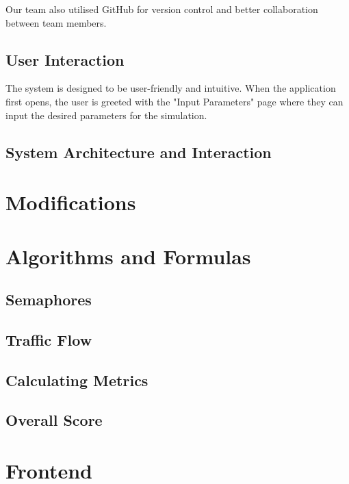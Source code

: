 \documentclass{article}
\begin{document}
        Our team also utilised GitHub for version control and better collaboration between team members.

    \subsection{User Interaction}

        The system is designed to be user-friendly and intuitive. When the application first opens, the user is greeted with the "Input Parameters"
        page where they can input the desired parameters for the simulation.
        
    \subsection{System Architecture and Interaction}

\section{Modifications}

\section{Algorithms and Formulas}

    \subsection{Semaphores}

    \subsection{Traffic Flow}

    \subsection{Calculating Metrics}

    \subsection{Overall Score}

\section{Frontend}
\end{document}
